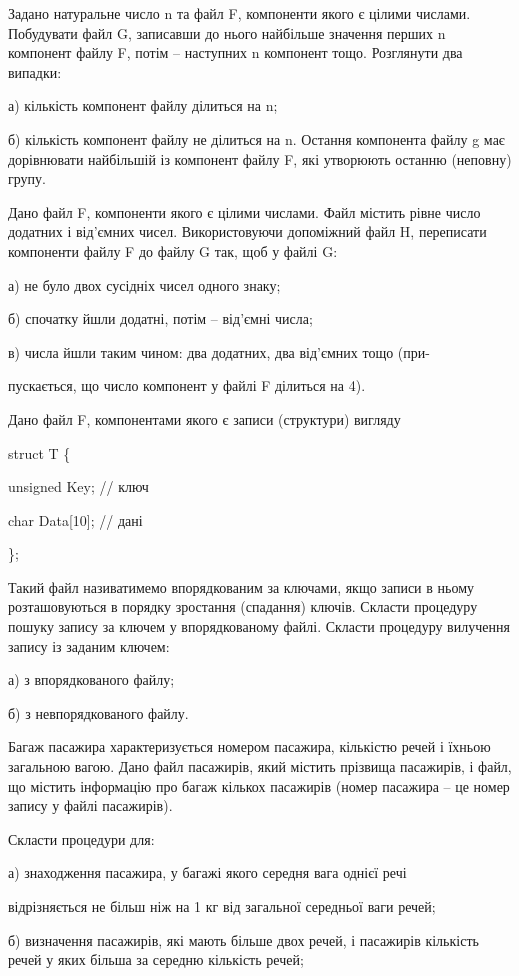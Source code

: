 \documentclass[]{article}
\begin{document}
Задано натуральне число n та файл F, компоненти якого є цілими числами.
Побудувати файл G, записавши до нього найбільше значення перших n
компонент файлу F, потім -- наступних n компонент тощо. Розглянути два
випадки:

а) кількість компонент файлу ділиться на n;

б) кількість компонент файлу не ділиться на n. Остання компонента файлу
g має дорівнювати найбільшій із компонент файлу F, які утворюють останню
(неповну) групу.

Дано файл F, компоненти якого є цілими числами. Файл містить рівне число
додатних і від'ємних чисел. Використовуючи допоміжний файл H, переписати
компоненти файлу F до файлу G так, щоб у файлі G:

а) не було двох сусідніх чисел одного знаку;

б) спочатку йшли додатні, потім -- від'ємні числа;

в) числа йшли таким чином: два додатних, два від'ємних тощо (при-

пускається, що число компонент у файлі F ділиться на 4).

Дано файл F, компонентами якого є записи (структури) вигляду

struct T \{

unsigned Key; // ключ

char Data{[}10{]}; // дані

\};

Такий файл називатимемо впорядкованим за ключами, якщо записи в ньому
розташовуються в порядку зростання (спадання) ключів. Скласти процедуру
пошуку запису за ключем у впорядкованому файлі. Скласти процедуру
вилучення запису із заданим ключем:

а) з впорядкованого файлу;

б) з невпорядкованого файлу.

Багаж пасажира характеризується номером пасажира, кількістю речей і
їхньою загальною вагою. Дано файл пасажирів, який містить прізвища
пасажирів, і файл, що містить інформацію про багаж кількох пасажирів
(номер пасажира -- це номер запису у файлі пасажирів).

Скласти процедури для:

а) знаходження пасажира, у багажі якого середня вага однієї речі

відрізняється не більш ніж на 1 кг від загальної середньої ваги речей;

б) визначення пасажирів, які мають більше двох речей, і пасажирів
кількість речей у яких більша за середню кількість речей;
\end{document}
